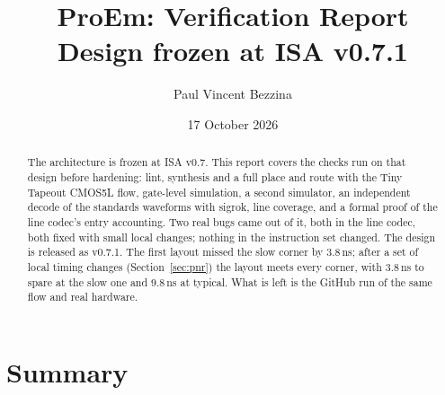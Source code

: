 \documentclass[11pt,a4paper]{article}
\title{ProEm: Verification Report\\\large Design frozen at ISA v0.7.1}
\author{Paul Vincent Bezzina}
\date{17 October 2026}
\begin{document}
\maketitle
\thispagestyle{fancy}

\begin{abstract}
The architecture is frozen at ISA v0.7. This report covers the checks run on that design before hardening: lint, synthesis and a full place and route with the Tiny Tapeout CMOS5L flow, gate-level simulation, a second simulator, an independent decode of the standards waveforms with sigrok, line coverage, and a formal proof of the line codec's entry accounting. Two real bugs came out of it, both in the line codec, both fixed with small local changes; nothing in the instruction set changed. The design is released as v0.7.1. The first layout missed the slow corner by 3.8\,ns; after a set of local timing changes (Section~\ref{sec:pnr}) the layout meets every corner, with 3.8\,ns to spare at the slow one and 9.8\,ns at typical. What is left is the GitHub run of the same flow and real hardware.
\end{abstract}

\section{Summary}
\end{document}
